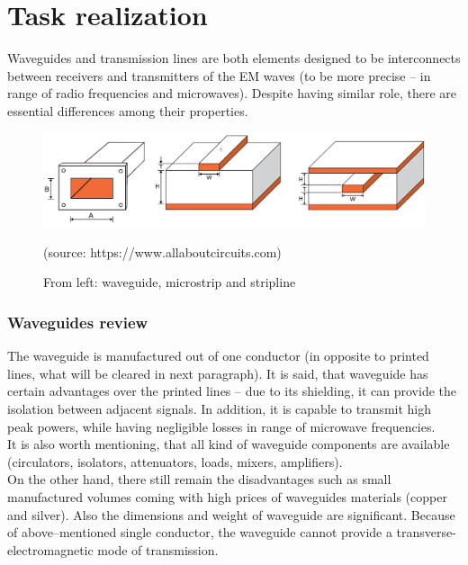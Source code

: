 \documentclass[eng,printmode]{mgr}
\begin{document}
\section{Task realization}
Waveguides and transmission lines are both elements designed to be interconnects between receivers and transmitters of the EM waves (to be more precise -- in range of radio frequencies and microwaves). Despite having similar role, there are essential differences among their properties.

\begin{figure}[h]
	\centering
	\includegraphics[width=0.8\linewidth]{technology}
	\caption{From left: waveguide, microstrip and stripline} (source: https://www.allaboutcircuits.com)
	\label{fig:technology}
\end{figure}

	

\subsubsection{Waveguides review }
The waveguide is manufactured out of one conductor (in opposite to printed lines, what will be cleared in next paragraph). It is said, that waveguide has certain advantages over the printed lines
-- due to its shielding, it can provide the isolation between adjacent signals. In addition, it is capable to transmit high peak powers, while having negligible losses in range of microwave frequencies.\\
It is also worth mentioning, that all kind of waveguide components are available (circulators, isolators, attenuators, loads, mixers, amplifiers).
\\
On the other hand, there still remain the disadvantages such as small manufactured volumes coming with high prices of waveguides materials (copper and silver). Also the dimensions and weight of waveguide are significant. Because of above--mentioned single conductor, the waveguide cannot provide a transverse-electromagnetic mode of transmission.
\end{document}
